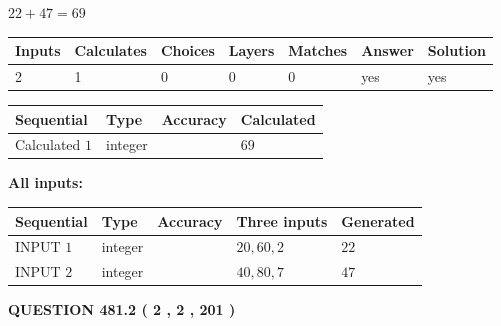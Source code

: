 \documentclass[12pt]{article}
\begin{document}
 

$ %
22 +  %
47=   %
69$
 
 
\noindent{}
 
 

 
   
   
   
   
\noindent\begin{tabular}{|l|l|l|l|l|l|l|}
 \hline
Inputs & Calculates & Choices & Layers & Matches & Answer & Solution \\ \hline
 2  & 
 1  & 
 0
  & 
 0  & 
 0  & 
  yes & 
  yes 
  \\ \hline
 \end{tabular}
   
   
   
   
\noindent{}
   
   
  
  
\noindent\begin{tabular}{|l|l|l|l|}
\hline
 Sequential & Type & Accuracy & Calculated \\ 
\hline
 
 
  Calculated $  1 $ & integer &  & 
  $ 69 $ 
 \\  \hline  
 \end{tabular}
   
   
   
   
\noindent\vspace{0.1in}\hspace{-0.08in} {\textbf{\Large{All inputs: }}}
   
   
  
  
\noindent\begin{tabular}{|l|l|l|l|l|}
\hline
 Sequential & Type & Accuracy & Three inputs & Generated \\ 
\hline
 
 
  INPUT $  1 $ & integer &  & $
 20
 , 
 60
 , 
 2
 $ & $ 22 $ 
 \\  \hline  
 
 
  INPUT $  2 $ & integer &  & $
 40
 , 
 80
 , 
 7
 $ & $ 47 $ 
 \\  \hline  
 \end{tabular}
   
   
  
\vspace{0.2in}
  
{\textbf{\Large{QUESTION
481.2 
 ( 2 , 2 , 201 )
}}}
  
\end{document}
